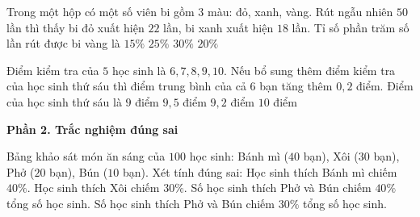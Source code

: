 \begin{ex} %
Trong một hộp có một số viên bi gồm $3$ màu: đỏ, xanh, vàng. Rút ngẫu nhiên $50$ lần thì thấy bi đỏ xuất hiện $22$ lần, bi xanh xuất hiện $18$ lần. Tỉ số phần trăm số lần rút được bi vàng là
\choice
{$15\%$}
{$25\%$}
{$30\%$}
{\True $20\%$}
\end{ex}

\begin{ex} %
Điểm kiểm tra của $5$ học sinh là $6, 7, 8, 9, 10$. Nếu bổ sung thêm điểm kiểm tra của học sinh thứ sáu thì điểm trung bình của cả $6$ bạn tăng thêm $0{,}2$ điểm. Điểm của học sinh thứ sáu là
\choice
{$9$ điểm}
{$9{,}5$ điểm}
{\True $9{,}2$ điểm}
{$10$ điểm}
\end{ex}

\textbf{Phần 2. Trắc nghiệm đúng sai}

\begin{ex} %
Bảng khảo sát món ăn sáng của $100$ học sinh: Bánh mì ($40$ bạn), Xôi ($30$ bạn), Phở ($20$ bạn), Bún ($10$ bạn). Xét tính đúng sai:
\choiceTF
{\True Học sinh thích Bánh mì chiếm $40\%$.}
{\True Học sinh thích Xôi chiếm $30\%$.}
{Số học sinh thích Phở và Bún chiếm $40\%$ tổng số học sinh.}
{\True Số học sinh thích Phở và Bún chiếm $30\%$ tổng số học sinh.}
\end{ex}

